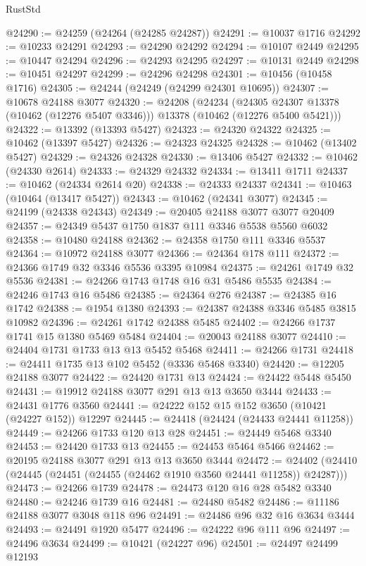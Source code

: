 \begin{lexlean}{RustStd}
\begin{coremodule}
@24290 := @24259 (@24264 (@24285 @24287))
@24291 := @10037 @1716
@24292 := @10233 @24291
@24293 := @24290 @24292
@24294 := @10107 @2449
@24295 := @10447 @24294
@24296 := @24293 @24295
@24297 := @10131 @2449
@24298 := @10451 @24297
@24299 := @24296 @24298
@24301 := @10456 (@10458 @1716)
@24305 := @24244 (@24249 (@24299 @24301 @10695))
@24307 := @10678 @24188 @3077
@24320 := @24208
    (@24234
      (@24305 @24307 @13378 (@10462 (@12276 @5407 @3346)))
      @13378
      (@10462 (@12276 @5400 @5421)))
@24322 := @13392 (@13393 @5427)
@24323 := @24320 @24322
@24325 := @10462 (@13397 @5427)
@24326 := @24323 @24325
@24328 := @10462 (@13402 @5427)
@24329 := @24326 @24328
@24330 := @13406 @5427
@24332 := @10462 (@24330 @2614)
@24333 := @24329 @24332
@24334 := @13411 @1711
@24337 := @10462 (@24334 @2614 @20)
@24338 := @24333 @24337
@24341 := @10463 (@10464 (@13417 @5427))
@24343 := @10462 (@24341 @3077)
@24345 := @24199 (@24338 @24343)
@24349 := @20405 @24188 @3077 @3077 @20409
@24357 := @24349 @5437 @1750 @1837 @111 @3346 @5538 @5560 @6032
@24358 := @10480 @24188
@24362 := @24358 @1750 @111 @3346 @5537
@24364 := @10972 @24188 @3077
@24366 := @24364 @178 @111
@24372 := @24366 @1749 @32 @3346 @5536 @3395 @10984
@24375 := @24261 @1749 @32 @5536
@24381 := @24266 @1743 @1748 @16 @31 @5486 @5535
@24384 := @24246 @1743 @16 @5486
@24385 := @24364 @276
@24387 := @24385 @16 @1742
@24388 := @1954 @1380
@24393 := @24387 @24388 @3346 @5485 @3815 @10982
@24396 := @24261 @1742 @24388 @5485
@24402 := @24266 @1737 @1741 @15 @1380 @5469 @5484
@24404 := @20043 @24188 @3077
@24410 := @24404 @1731 @1733 @13 @13 @5452 @5468
@24411 := @24266 @1731
@24418 := @24411 @1735 @13 @102 @5452 (@3336 @5468 @3340)
@24420 := @12205 @24188 @3077
@24422 := @24420 @1731 @13
@24424 := @24422 @5448 @5450
@24431 := @19912 @24188 @3077 @291 @13 @13 @3650 @3444
@24433 := @24431 @1776 @3560
@24441 := @24222 @152 @15 @152 @3650 (@10421 (@24227 @152)) @12297
@24445 := @24418 (@24424 (@24433 @24441 @11258))
@24449 := @24266 @1733 @120 @13 @28
@24451 := @24449 @5468 @3340
@24453 := @24420 @1733 @13
@24455 := @24453 @5464 @5466
@24462 := @20195 @24188 @3077 @291 @13 @13 @3650 @3444
@24472 := @24402 (@24410 (@24445 (@24451 (@24455 (@24462 @1910 @3560 @24441 @11258)) @24287)))
@24473 := @24266 @1739
@24478 := @24473 @120 @16 @28 @5482 @3340
@24480 := @24246 @1739 @16
@24481 := @24480 @5482
@24486 := @11186 @24188 @3077 @3048 @118 @96
@24491 := @24486 @96 @32 @16 @3634 @3444
@24493 := @24491 @1920 @5477
@24496 := @24222 @96 @111 @96
@24497 := @24496 @3634
@24499 := @10421 (@24227 @96)
@24501 := @24497 @24499 @12193

\end{coremodule}
\end{lexlean}

